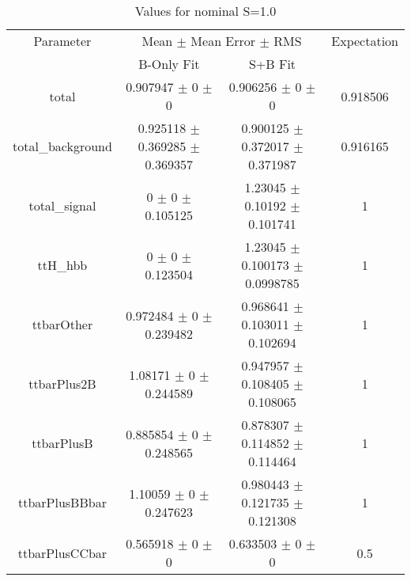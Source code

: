 \begin{table}
\centering
\caption{Values for nominal S=1.0}
\begin{tabular}{cccc}
\toprule
Parameter & \multicolumn{2}{c}{Mean $\pm$ Mean Error $\pm$ RMS} & Expectation\\
 & B-Only Fit & S+B Fit & \\
\midrule
total & \num{0.907947} $\pm$ \num{0} $\pm$ \num{0} & \num{0.906256} $\pm$ \num{0} $\pm$ \num{0} & \num{0.918506}\\
total\_background & \num{0.925118} $\pm$ \num{0.369285} $\pm$ \num{0.369357} & \num{0.900125} $\pm$ \num{0.372017} $\pm$ \num{0.371987} & \num{0.916165}\\
total\_signal & \num{0} $\pm$ \num{0} $\pm$ \num{0.105125} & \num{1.23045} $\pm$ \num{0.10192} $\pm$ \num{0.101741} & \num{1}\\
ttH\_hbb & \num{0} $\pm$ \num{0} $\pm$ \num{0.123504} & \num{1.23045} $\pm$ \num{0.100173} $\pm$ \num{0.0998785} & \num{1}\\
ttbarOther & \num{0.972484} $\pm$ \num{0} $\pm$ \num{0.239482} & \num{0.968641} $\pm$ \num{0.103011} $\pm$ \num{0.102694} & \num{1}\\
ttbarPlus2B & \num{1.08171} $\pm$ \num{0} $\pm$ \num{0.244589} & \num{0.947957} $\pm$ \num{0.108405} $\pm$ \num{0.108065} & \num{1}\\
ttbarPlusB & \num{0.885854} $\pm$ \num{0} $\pm$ \num{0.248565} & \num{0.878307} $\pm$ \num{0.114852} $\pm$ \num{0.114464} & \num{1}\\
ttbarPlusBBbar & \num{1.10059} $\pm$ \num{0} $\pm$ \num{0.247623} & \num{0.980443} $\pm$ \num{0.121735} $\pm$ \num{0.121308} & \num{1}\\
ttbarPlusCCbar & \num{0.565918} $\pm$ \num{0} $\pm$ \num{0} & \num{0.633503} $\pm$ \num{0} $\pm$ \num{0} & \num{0.5}\\
\bottomrule
\end{tabular}
\end{table}